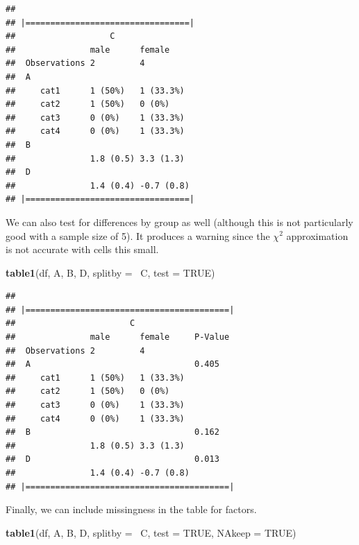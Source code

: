 \documentclass[]{tufte-book}
\newenvironment{Shaded}{}{}
\newcommand{\KeywordTok}[1]{\textcolor[rgb]{0.00,0.44,0.13}{\textbf{#1}}}
\newcommand{\DataTypeTok}[1]{\textcolor[rgb]{0.56,0.13,0.00}{#1}}
\newcommand{\OtherTok}[1]{\textcolor[rgb]{0.00,0.44,0.13}{#1}}
\newcommand{\OperatorTok}[1]{\textcolor[rgb]{0.40,0.40,0.40}{#1}}
\newcommand{\NormalTok}[1]{#1}
\theoremstyle{definition}
\theoremstyle{definition}
\theoremstyle{remark}
\begin{document}
\begin{verbatim}
## 
## |=================================|
##                   C 
##               male      female    
##  Observations 2         4         
##  A                                
##     cat1      1 (50%)   1 (33.3%) 
##     cat2      1 (50%)   0 (0%)    
##     cat3      0 (0%)    1 (33.3%) 
##     cat4      0 (0%)    1 (33.3%) 
##  B                                
##               1.8 (0.5) 3.3 (1.3) 
##  D                                
##               1.4 (0.4) -0.7 (0.8)
## |=================================|
\end{verbatim}

We can also test for differences by group as well (although this is not
particularly good with a sample size of 5). It produces a warning since
the \(\chi^2\) approximation is not accurate with cells this small.

\begin{Shaded}
\begin{Highlighting}[]
\KeywordTok{table1}\NormalTok{(df, A, B, D, }\DataTypeTok{splitby =} \OperatorTok{~}\NormalTok{C, }\DataTypeTok{test =} \OtherTok{TRUE}\NormalTok{)}
\end{Highlighting}
\end{Shaded}

\begin{verbatim}
## 
## |=========================================|
##                       C 
##               male      female     P-Value
##  Observations 2         4                 
##  A                                 0.405  
##     cat1      1 (50%)   1 (33.3%)         
##     cat2      1 (50%)   0 (0%)            
##     cat3      0 (0%)    1 (33.3%)         
##     cat4      0 (0%)    1 (33.3%)         
##  B                                 0.162  
##               1.8 (0.5) 3.3 (1.3)         
##  D                                 0.013  
##               1.4 (0.4) -0.7 (0.8)        
## |=========================================|
\end{verbatim}

Finally, we can include missingness in the table for factors.

\begin{Shaded}
\begin{Highlighting}[]
\KeywordTok{table1}\NormalTok{(df, A, B, D, }\DataTypeTok{splitby =} \OperatorTok{~}\NormalTok{C, }\DataTypeTok{test =} \OtherTok{TRUE}\NormalTok{, }
    \DataTypeTok{NAkeep =} \OtherTok{TRUE}\NormalTok{)}
\end{Highlighting}
\end{Shaded}
\end{document}
